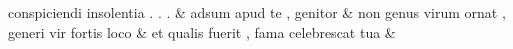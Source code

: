 \documentclass[12pt,onecolumn,twoside,a4paper]{memoir}
\begin{document}
\begin{pairs}
\begin{Leftside}
                              conspiciendi
                              insolentia
                              .
                              .
                              . \&
                         \stanza {}
                     adsum
                              apud
                              te
                              ,
                              genitor \&
                         \stanza {}
                     non
                              genus
                              virum
                              ornat
                              ,
                              generi
                              vir
                              fortis
                              loco \&
                         \stanza {}
                     et
                              qualis
                              fuerit
                              ,
                              fama
                              celebrescat
                              tua \&
                         \stanza {}
                     

\end{Leftside}
\end{pairs}
\end{document}
